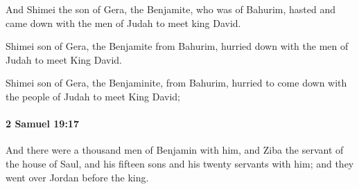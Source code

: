 			\begin{versebox}
					\item[BHS] 
					\item[ASV] And Shimei the son of Gera, the Benjamite, who was of Bahurim, hasted and came down with the men of Judah to meet king David.
					\item[NIV] Shimei son of Gera, the Benjamite from Bahurim, hurried down with the men of Judah to meet King David.
					\item[NRSV] Shimei son of Gera, the Benjaminite, from Bahurim, hurried to come down with the people of Judah to meet King David;
			\end{versebox}

		\paragraph{2 Samuel 19:17} %
			\label{2SAMUEL-19-17}

			And there were a thousand men of Benjamin with him, and Ziba the servant of the house of Saul, and his fifteen sons and his twenty servants with him; and they went over Jordan before the king.


